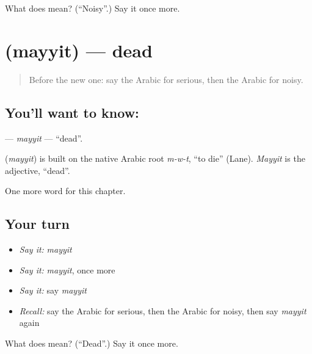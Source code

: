 \begin{tcolorbox}[breakable,colback=teal!4,colframe=teal!35!black,title={Before you move on}]
What does  mean? (\textquotedblleft{}Noisy\textquotedblright{}.) Say it once more.
\end{tcolorbox}
\section[\texorpdfstring{\ar{ميت} (mayyit)}{ميت (mayyit)}]{ (mayyit) — dead}

\label{lesson:AR-C242-mayyit}



\begin{quote}
Before the new one: say the Arabic for serious, then the Arabic for noisy.
\end{quote}

\subsection*{You'll want to know: }
\textbf{} — \emph{mayyit} — \textquotedblleft{}dead\textquotedblright{}.

\begin{cousinweb}
\textbf{} (\emph{mayyit}) is built on the native Arabic root \emph{m-w-t}, \textquotedblleft{}to die\textquotedblright{} (Lane). \emph{Mayyit} is the adjective, \textquotedblleft{}dead\textquotedblright{}.
\end{cousinweb}

\begin{grammarlens}[title={What you've built}]
One more word for this chapter.
\end{grammarlens}

\subsection*{Your turn}
\begin{itemize}
\raggedright
  \item \emph{Say it:} \emph{mayyit}
  \item \emph{Say it:} \emph{mayyit}, once more
  \item \emph{Say it:} say \emph{mayyit}
  \item \emph{Recall:} say the Arabic for serious, then the Arabic for noisy, then say \emph{mayyit} again
\end{itemize}

\begin{tcolorbox}[breakable,colback=teal!4,colframe=teal!35!black,title={Before you move on}]
What does  mean? (\textquotedblleft{}Dead\textquotedblright{}.) Say it once more.
\end{tcolorbox}
